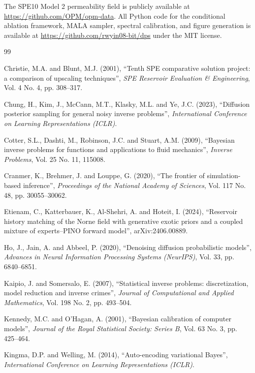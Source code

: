\documentclass[12pt]{article}
\begin{document}
The SPE10 Model 2 permeability field is publicly available at \url{https://github.com/OPM/opm-data}. All Python code for the conditional ablation framework, MALA sampler, spectral calibration, and figure generation is available at \url{https://github.com/rwyin08-bit/dps} under the MIT license.

\begin{thebibliography}{99}

 Christie, M.A. and Blunt, M.J. (2001), ``Tenth SPE comparative solution project: a comparison of upscaling techniques'', \emph{SPE Reservoir Evaluation \& Engineering}, Vol. 4 No. 4, pp. 308--317.

 Chung, H., Kim, J., McCann, M.T., Klasky, M.L. and Ye, J.C. (2023), ``Diffusion posterior sampling for general noisy inverse problems'', \emph{International Conference on Learning Representations (ICLR)}.

 Cotter, S.L., Dashti, M., Robinson, J.C. and Stuart, A.M. (2009), ``Bayesian inverse problems for functions and applications to fluid mechanics'', \emph{Inverse Problems}, Vol. 25 No. 11, 115008.

 Cranmer, K., Brehmer, J. and Louppe, G. (2020), ``The frontier of simulation-based inference'', \emph{Proceedings of the National Academy of Sciences}, Vol. 117 No. 48, pp. 30055--30062.

 Etienam, C., Katterbauer, K., Al-Shehri, A. and Hoteit, I. (2024), ``Reservoir history matching of the Norne field with generative exotic priors and a coupled mixture of experts--PINO forward model'', arXiv:2406.00889.

 Ho, J., Jain, A. and Abbeel, P. (2020), ``Denoising diffusion probabilistic models'', \emph{Advances in Neural Information Processing Systems (NeurIPS)}, Vol. 33, pp. 6840--6851.

 Kaipio, J. and Somersalo, E. (2007), ``Statistical inverse problems: discretization, model reduction and inverse crimes'', \emph{Journal of Computational and Applied Mathematics}, Vol. 198 No. 2, pp. 493--504.

 Kennedy, M.C. and O'Hagan, A. (2001), ``Bayesian calibration of computer models'', \emph{Journal of the Royal Statistical Society: Series B}, Vol. 63 No. 3, pp. 425--464.

 Kingma, D.P. and Welling, M. (2014), ``Auto-encoding variational Bayes'', \emph{International Conference on Learning Representations (ICLR)}.


\end{thebibliography}
\end{document}
